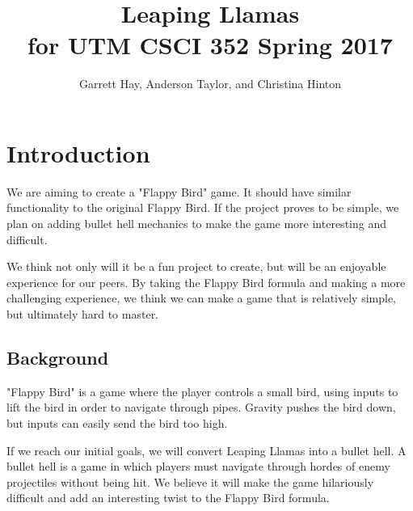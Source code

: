 \documentclass[10pt,conference,onecolumn,compsoc]{IEEEtran}
\begin{document}
\title{Leaping Llamas\\ for UTM CSCI 352 Spring 2017}

\author{Garrett Hay, Anderson Taylor, and Christina Hinton \\ %
}

\maketitle

\IEEEdisplaynontitleabstractindextext
\IEEEpeerreviewmaketitle

\section{Introduction}
	We are aiming to create a "Flappy Bird" game. It should have similar functionality to the original Flappy Bird. If the project proves to be simple, we plan on adding bullet hell mechanics to make the game more interesting and difficult. 

	We think not only will it be a fun project to create, but will be an enjoyable experience for our peers. By taking the Flappy Bird formula and making a more challenging experience, we think we can make a game that is relatively simple, but ultimately hard to master. 

\subsection{Background}
	"Flappy Bird" is a game where the player controls a small bird, using inputs to lift the bird in order to navigate through pipes. Gravity pushes the bird down, but inputs can easily send the bird too high.

	If we reach our initial goals, we will convert Leaping Llamas into a bullet hell. A bullet hell is a game in which players must navigate through hordes of enemy projectiles without being hit. We believe it will make the game hilariously difficult and add an interesting twist to the Flappy Bird formula.
\end{document}
